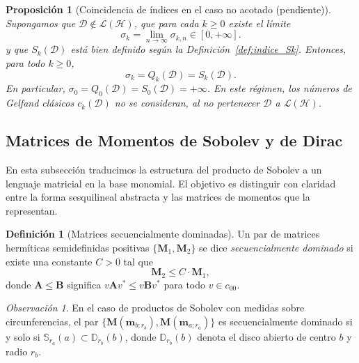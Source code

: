 \documentclass[12pt,a4paper]{article}
\newtheorem{proposition}{Proposición}
\theoremstyle{definition}
\newtheorem{definition}{Definición}
\theoremstyle{remark}
\newtheorem{remark}{Observación}
\begin{document}
\begin{proposition}[Coincidencia de índices en el caso no acotado (pendiente)]\label{prop:coincidencia_no_acotado_pendiente}
	Supongamos que $\mathcal{D}\notin\mathcal{L}(\mathcal{H})$, que para cada $k\ge0$ existe el límite
	\[
		\sigma_k=\lim_{n\to\infty}\sigma_{k,n}\in[0,+\infty].
	\]
	y que $S_k(\mathcal{D})$ está bien definido según la Definición~\ref{def:indice_Sk}. Entonces, para todo $k\ge0$,
	\[
		\sigma_{k}=Q_k(\mathcal{D})=S_k(\mathcal{D}).
	\]
	En particular, $\sigma_0=Q_0(\mathcal{D})=S_0(\mathcal{D})=+\infty$. En este régimen, los números de Gelfand clásicos $c_k(\mathcal{D})$ no se consideran, al no pertenecer $\mathcal{D}$ a $\mathcal{L}(\mathcal{H})$.
\end{proposition}

\subsection{Matrices de Momentos de Sobolev y de Dirac}

En esta subsección traducimos la estructura del producto de Sobolev a un lenguaje matricial en la base monomial. El objetivo es distinguir con claridad entre la forma sesquilineal abstracta y las matrices de momentos que la representan.

\begin{definition}[Matrices secuencialmente dominadas]\label{def:dominacion_secuencial}
	Un par de matrices hermíticas semidefinidas positivas $\{\mathbf{M}_1, \mathbf{M}_2\}$ se dice \emph{secuencialmente dominado} si existe una constante $C > 0$ tal que
	\[
		\mathbf{M}_2 \leq C \cdot \mathbf{M}_1,
	\]
	donde $\mathbf{A} \leq \mathbf{B}$ significa $v \mathbf{A} v^* \leq v \mathbf{B} v^*$ para todo $v \in c_{00}$.
\end{definition}

\begin{remark}
	En el caso de productos de Sobolev con medidas sobre circunferencias, el par $\{\mathbf{M}(\mathbf{m}_{b;r_b}), \mathbf{M}(\mathbf{m}_{a;r_a})\}$ es secuencialmente dominado si y solo si $\mathbb{S}_{r_a}(a) \subset \mathbb{D}_{r_b}(b)$, donde $\mathbb{D}_{r_b}(b)$ denota el disco abierto de centro $b$ y radio $r_b$.
\end{remark}
\end{document}
